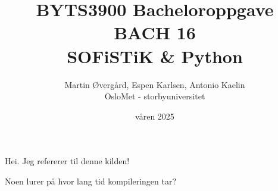\documentclass[12pt, norsk]{article}
\title{BYTS3900 Bacheloroppgave \\ BACH 16\\SOFiSTiK \& Python}
\author{Martin Øvergård, Espen Karlsen, Antonio Kaelin\\OsloMet - storbyuniversitet}
\date{våren 2025}
\begin{document}
\maketitle

Hei. Jeg refererer til denne kilden! \parencite[s. 27]{testreferanse}


Noen lurer på hvor lang tid kompileringen tar?

\printbibliography
\end{document}
